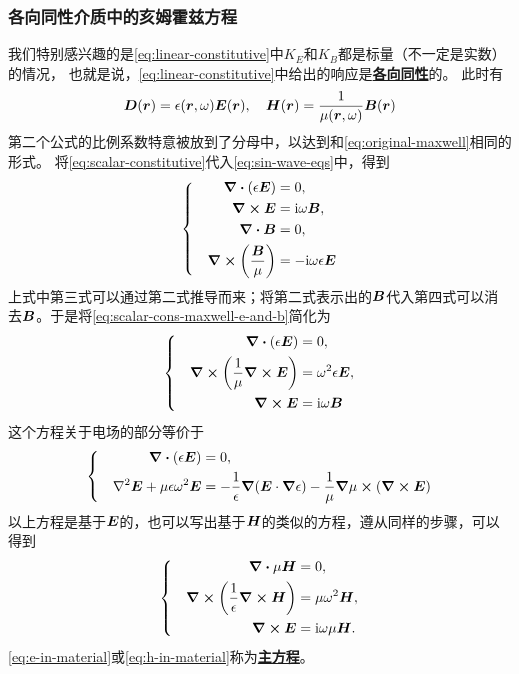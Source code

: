 \documentclass[UTF8, a4paper]{ctexart}
\newcommand*{\ii}{\mathrm{i}}
\newcommand*{\concept}[1]{\underline{\textbf{#1}}}
\newenvironment{bigcase}{\left\{\quad\begin{aligned}}{\end{aligned}\right.}
\begin{document}
\subsubsection{各向同性介质中的亥姆霍兹方程}

我们特别感兴趣的是\eqref{eq:linear-constitutive}中$K_E$和$K_B$都是标量（不一定是实数）的情况，
也就是说，\eqref{eq:linear-constitutive}中给出的响应是\concept{各向同性}的。
此时有
\begin{equation}
    \vb*{D}(\vb*{r}) = \epsilon(\vb*{r}, \omega) \vb*{E}(\vb*{r}), \quad \vb*{H}(\vb*{r}) = \frac{1}{\mu(\vb*{r}, \omega)} \vb*{B}(\vb*{r})
    \label{eq:scalar-constitutive}
\end{equation}
第二个公式的比例系数特意被放到了分母中，以达到和\eqref{eq:original-maxwell}相同的形式。
将\eqref{eq:scalar-constitutive}代入\eqref{eq:sin-wave-eqs}中，得到
\begin{equation}
    \begin{bigcase}
        \div{(\epsilon \vb*{E})} &= 0, \\
        \curl{\vb*{E}} &= \ii \omega \vb*{B}, \\
        \div{\vb*{B}} &= 0, \\
        \curl{\left(\frac{\vb*{B}}{\mu}\right)} &= - \ii \omega \epsilon \vb*{E}
    \end{bigcase}
    \label{eq:scalar-cons-maxwell-e-and-b}
\end{equation}
上式中第三式可以通过第二式推导而来；将第二式表示出的$\vb*{B}$代入第四式可以消去$\vb*{B}$。于是将\eqref{eq:scalar-cons-maxwell-e-and-b}简化为
\begin{equation}
    \begin{bigcase}
        \div{(\epsilon \vb*{E})} &= 0, \\
        \curl{ \left(\frac{1}{\mu} \curl{\vb*{E}} \right) } &= \omega^2 \epsilon \vb*{E}, \\
        \curl{\vb*{E}} &= \ii \omega \vb*{B}
    \end{bigcase}
    \label{eq:e-in-material}
\end{equation}
这个方程关于电场的部分等价于
\[
    \begin{bigcase}
        \div{(\epsilon \vb*{E})} &= 0, \\
        \laplacian \vb*{E} + \mu \epsilon \omega^2 \vb*{E} &= - \frac{1}{\epsilon} \grad{(\vb*{E} \cdot \grad{\epsilon})} - \frac{1}{\mu} \grad{\mu} \cross (\curl{\vb*{E}})
    \end{bigcase}
\]
以上方程是基于$\vb*{E}$的，也可以写出基于$\vb*{H}$的类似的方程，遵从同样的步骤，可以得到
\begin{equation}
    \begin{bigcase}
        \div{\mu \vb*{H}} &= 0, \\
        \curl{\left( \frac{1}{\epsilon} \curl{\vb*{H}} \right)} &=  \mu \omega^2 \vb*{H}, \\
        \curl{\vb*{E}} &= \ii \omega \mu \vb*{H}.
    \end{bigcase}
    \label{eq:h-in-material}
\end{equation}
\eqref{eq:e-in-material}或\eqref{eq:h-in-material}称为\concept{主方程}。
\end{document}
